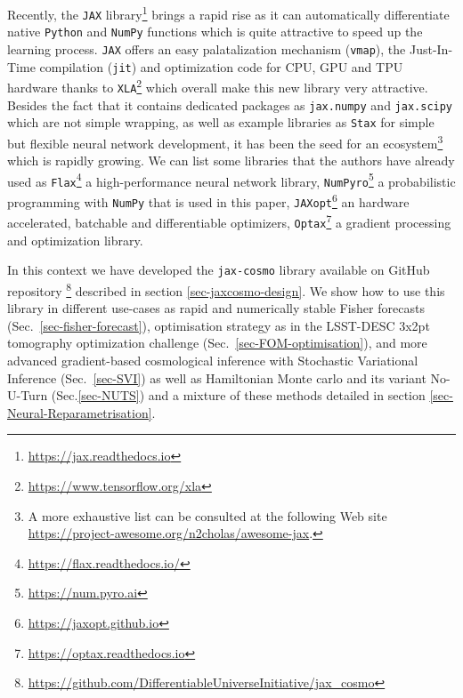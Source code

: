 \documentclass[final,5p,times,twocolumn,authoryear]{elsarticle}
\newcommand{\github}{\href{https://github.com/DifferentiableUniverseInitiative/jax\_cosmo}{\faGithub}}
\newcommand{\numpyro}{\texttt{NumPyro}}
\begin{document}
Recently, the \texttt{JAX} library\footnote{\url{https://jax.readthedocs.io}} \citep{jax2018github} brings a rapid rise as it can automatically differentiate native \texttt{Python} and \texttt{NumPy} functions which is quite attractive to speed up the learning process. \texttt{JAX} offers an easy palatalization mechanism (\texttt{vmap}), the Just-In-Time compilation (\texttt{jit}) and optimization code for CPU, GPU and TPU hardware thanks to \texttt{XLA}\footnote{\url{https://www.tensorflow.org/xla}} which overall make this new library very attractive. Besides the fact that it contains dedicated packages as \texttt{jax.numpy} and \texttt{jax.scipy} which are not simple wrapping, as well as example libraries as \texttt{Stax} for simple but flexible neural network development, it has been the seed for an ecosystem\footnote{A more exhaustive list can be consulted at the following Web site \url{https://project-awesome.org/n2cholas/awesome-jax}.} which is rapidly growing. We can list some libraries that the authors have already used as \texttt{Flax}\footnote{\url{https://flax.readthedocs.io/}} \citep{flax2020github} a high-performance neural network library, \numpyro\footnote{\url{https://num.pyro.ai}} \citep{phan2019composable,bingham2019pyro} a probabilistic programming with \texttt{NumPy} that is used in this paper, \texttt{JAXopt}\footnote{\url{https://jaxopt.github.io}} \citep{jaxopt_implicit_diff} an hardware accelerated, batchable and differentiable optimizers, \texttt{Optax}\footnote{\url{https://optax.readthedocs.io}} \citep{optax2020github} a gradient processing and optimization library.

In this context we have developed the \texttt{jax-cosmo} library available on GitHub repository \github\footnote{ \url{https://github.com/DifferentiableUniverseInitiative/jax_cosmo}} described in section \ref{sec-jaxcosmo-design}. We show how to use this library in different use-cases as rapid and numerically stable Fisher forecasts (Sec.~\ref{sec-fisher-forecast}), optimisation strategy as in the LSST-DESC 3x2pt tomography optimization challenge \citep{2021OJAp....4E..13Z} (Sec.~\ref{sec-FOM-optimisation}), and more advanced gradient-based cosmological inference with Stochastic Variational Inference (Sec.~\ref{sec-SVI}) as well as Hamiltonian Monte carlo and its variant No-U-Turn (Sec.\ref{sec-NUTS}) and a mixture of these methods detailed in section \ref{sec-Neural-Reparametrisation}.

\end{document}
